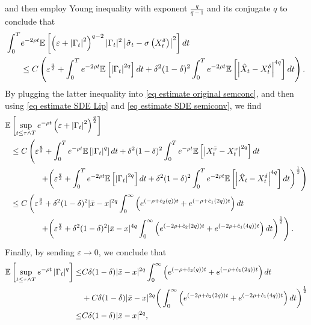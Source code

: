 \documentclass[11pt]{amsart}
\theoremstyle{plain}
\def \dd{{\rm d}}
\numberwithin{equation}{section}
\begin{document}
and then employ Young inequality with exponent $\frac{q}{q-1}$ and its conjugate $q$ to conclude that
$$
\begin{aligned}
\int_{0}^{T} & e^{-2 \rho t} 
\mathbb E \left[ \left(\varepsilon+\left|\Gamma_{t}\right|^{2}\right)^{q-2} |\Gamma_{t}|^{2}\left| \hat{\sigma}_{t}-\sigma\left(X_t^\delta\right)\right|^2 \right] \dd t \\
& \leq C \left( \varepsilon^{\frac q 2} 
+\int_{0}^{T} e^{-2 \rho t} \mathbb E \left[ \left| \Gamma_t \right|^{2q}  \right] \dd t 
+ \delta^2 (1-\delta)^2  \int_0^T e^{-2 \rho t} \mathbb E \left[ \left|   \hat X _t  - X_t^\delta \right|^{4q} \right] \dd t \right). 
\end{aligned}
$$
By plugging the latter inequality into \eqref{eq estimate original semconc}, and then using \eqref{eq estimate SDE Lip} and \eqref{eq estimate SDE semiconv}, we find
$$
\begin{aligned}
\mathbb{E} &\left[\sup _{t \leq \tau \land T} e^{-\rho t}\left(\varepsilon+\left|\Gamma_ t \right|^{2}\right)^{\frac{q}{2}}\right] \\
& \leq  C \left(  \varepsilon^{\frac{q}{2}} 
+\int_{0}^{T} e^{-\rho t} \mathbb E \left[  \left|\Gamma_{t}\right|^{q} \right] d t + \delta^2 (1-\delta)^2  \int_{0}^{T} e^{-\rho t}\mathbb E \left[ \left|X_{t}^{\bar{x}}-X_{t}^{x}\right|^{2 q} \right] \dd t \right.\\
& \quad \qquad \ \ \left. + \bigg(\varepsilon^{\frac q 2} 
+\int_{0}^{T} e^{-2 \rho t} \mathbb E \left[ \left| \Gamma_t \right|^{2q}  \right] \dd t 
+ \delta^2 (1-\delta)^2  \int_0^T e^{-2 \rho t} \mathbb E \left[ \left|   \hat X _t  - X_t^\delta \right|^{4q} \right] \dd t    \bigg)^{\frac{1}{2}} \right) \\
& \leq C \left(  \varepsilon^{\frac{q}{2}} 
+ \delta^2(1-\delta)^2 |\bar{x}-x|^{2 q} \int_{0}^{\infty} \left( e^{(-\rho+ \hat c_2(q)) t} + e^{(-\rho+ \hat c_1(2q)) t} \right) \dd t  \right.\\
& \quad \qquad \ \ \left. + \bigg(\varepsilon^{\frac q 2} 
+  \delta^2(1-\delta)^2 |\bar{x}-x|^{4 q} \int_{0}^{\infty} \left( e^{(-2 \rho + \hat c_2 (2q)) t} + e^{(-2 \rho + \hat c_1 (4q)) t} \right) \dd t \bigg)^{\frac{1}{2}} \right).
\end{aligned}
$$ 
Finally, by sending $\varepsilon \to 0$, we conclude that
$$
\begin{aligned}
\mathbb{E} \left[\sup _{t \leq \tau \land T} e^{-\rho t} \left|\Gamma_ t \right|^{q} \right] 
\leq&  C \delta(1-\delta) |\bar{x}-x|^{2 q}   \int_{0}^{\infty} \left( e^{(-\rho+ \hat c_2(q)) t} + e^{(-\rho+ \hat c_1(2q)) t} \right) \dd t \\
&+  C \delta(1-\delta) |\bar{x}-x|^{2 q}  \bigg(\int_{0}^{\infty} \left( e^{(-2 \rho + \hat c_2 (2q)) t} + e^{(-2 \rho + \hat c_1 (4q)) t} \right) \dd t \bigg)^{\frac{1}{2}} \\
\leq &  C \delta(1-\delta) |\bar{x}-x|^{2 q}, 
\end{aligned}
$$
\end{document}
